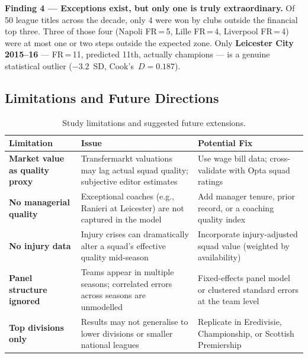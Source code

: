 \documentclass[11pt, a4paper]{article}
\begin{document}
\begin{alertbox}
  \textbf{Finding 4 --- Exceptions exist, but only one is truly extraordinary.}
  Of 50 league titles across the decade, only 4 were won by clubs outside the
  financial top three. Three of those four (Napoli FR\,=\,5, Lille FR\,=\,4,
  Liverpool FR\,=\,4) were at most one or two steps outside the expected zone.
  Only \textbf{Leicester City 2015--16} --- FR\,=\,11, predicted 11th, actually
  champions --- is a genuine statistical outlier ($-3.2$~SD, Cook's~$D = 0.187$).
\end{alertbox}

\subsection{Limitations and Future Directions}

\begin{table}[H]
  \centering
  \small
  \caption{Study limitations and suggested future extensions.}
  \label{tab:limitations}
  \begin{tabular}{p{2.8cm} p{5.8cm} p{5.4cm}}
    \toprule
    \rowcolor{NavyBlue}
    \color{white}\textbf{Limitation} &
    \color{white}\textbf{Issue} &
    \color{white}\textbf{Potential Fix} \\
    \midrule
    \textbf{Market value as quality proxy}
      & Transfermarkt valuations may lag actual squad quality; subjective editor estimates
      & Use wage bill data; cross-validate with Opta squad ratings \\
    \rowcolor{RowA}
    \textbf{No managerial quality}
      & Exceptional coaches (e.g., Ranieri at Leicester) are not captured in the model
      & Add manager tenure, prior record, or a coaching quality index \\
    \textbf{No injury data}
      & Injury crises can dramatically alter a squad's effective quality mid-season
      & Incorporate injury-adjusted squad value (weighted by availability) \\
    \rowcolor{RowA}
    \textbf{Panel structure ignored}
      & Teams appear in multiple seasons; correlated errors across seasons are unmodelled
      & Fixed-effects panel model or clustered standard errors at the team level \\
    \textbf{Top divisions only}
      & Results may not generalise to lower divisions or smaller national leagues
      & Replicate in Eredivisie, Championship, or Scottish Premiership \\
    \bottomrule
  \end{tabular}
\end{table}
\end{document}
